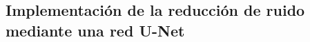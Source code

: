 \documentclass[../../book-main_es.tex]{subfiles}
\begin{document}


\subsection{Implementación de la reducción de ruido mediante una red U-Net}
\label{sec:UNet-implement}
\end{document}
